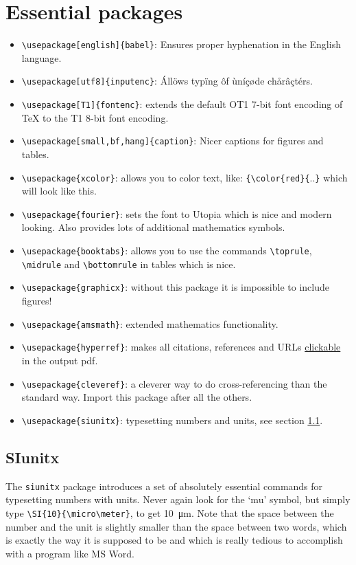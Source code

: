 \documentclass{article}
\begin{document}
\newpage
\section{Essential packages}


\begin{itemize}
\item \verb|\usepackage[english]{babel}|: Ensures proper hyphenation in the English language.
\item \verb|\usepackage[utf8]{inputenc}|: Állöws typïng ôf ùníçøde chårâçtérs.
\item \verb|\usepackage[T1]{fontenc}|: extends the default OT1 7-bit font encoding of TeX to the T1 8-bit font encoding.
\item \verb|\usepackage[small,bf,hang]{caption}|: Nicer captions for figures and tables.
\item \verb|\usepackage{xcolor}|: allows you to color text, like: \verb|{\color{red}{|..\verb|}| which will look {\color{red} like this}.
\item \verb|\usepackage{fourier}|: sets the font to Utopia which is nice and modern looking. Also provides lots of additional mathematics symbols.
\item \verb|\usepackage{booktabs}|: allows you to use the commands \verb|\toprule|, \verb|\midrule| and \verb|\bottomrule| in tables which is nice.
\item \verb|\usepackage{graphicx}|: without this package it is impossible to include figures!
\item \verb|\usepackage{amsmath}|: extended mathematics functionality.
\item \verb|\usepackage{hyperref}|: makes all citations, references and URLs \hyperref[clickable]{clickable} in the output pdf. \label{clickable}
\item \verb|\usepackage{cleveref}|: a cleverer way to do cross-referencing than the standard way. Import this package after all the others.
\item \verb|\usepackage{siunitx}|: typesetting numbers and units, see section \ref{sec:siunitx}.
\end{itemize}




\subsection{SIunitx}\label{sec:siunitx}

The \verb|siunitx| package introduces a set of absolutely essential commands for typesetting numbers with units. Never again look for the `mu' symbol, but simply type \verb|\SI{10}{\micro\meter}|, to get \SI{10}{\micro\meter}. Note that the space between the number and the unit is slightly smaller than the space between two words, which is exactly the way it is supposed to be and which is really tedious to accomplish with a program like MS Word.
\end{document}
